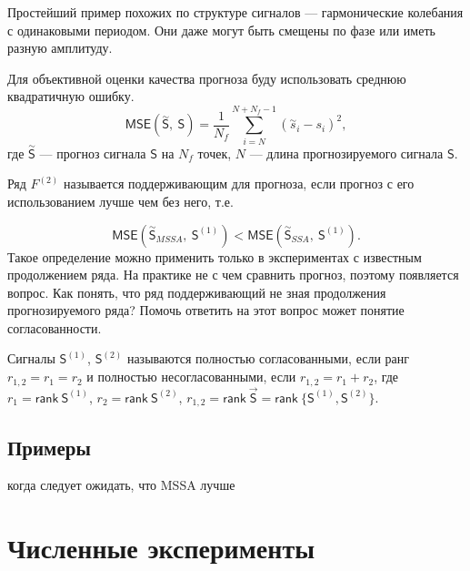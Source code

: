 \documentclass[specialist, substylefile = spbureport.rtx,
    subf,href,colorlinks=true, 12pt]{disser}
\newtheorem*{example}{Пример}
\newcommand{\rank}{\mathsf{rank}\ }
\newcommand{\sfS}{\mathsf{S}}
\newcommand{\MS}{\vec{\sfS}}
\newcommand{\MSE}{\mathsf{MSE}}
\begin{document}
        Простейший пример похожих по структуре сигналов --- гармонические колебания с одинаковыми периодом. Они даже могут быть смещены по фазе или иметь разную амплитуду.

        Для объективной оценки качества прогноза буду использовать среднюю квадратичную ошибку.
        $$\mathsf{MSE(\overset{\sim}{S},\ S)} = \frac{1}{N_{f}} \sum_{i = N}^{N + N_{f} - 1} (\overset{\sim}{s}_i - s_i)^2,$$
        где $\overset{\sim}{\sfS}$ --- прогноз сигнала $\sfS$ на $N_{f}$ точек, $N$ --- длина прогнозируемого сигнала $\sfS$.
    

        Ряд $F^{(2)}$ называется поддерживающим для прогноза, если прогноз с его использованием лучше чем без него, т.е.
    
        $$\MSE(\overset{\sim}{\sfS}_{MSSA},\ \sfS^{(1)}) < \MSE(\overset{\sim}{\sfS}_{SSA},\ \sfS^{(1)}).$$
        Такое определение можно применить только в экспериментах с известным продолжением ряда. На практике не с чем сравнить прогноз, поэтому появляется вопрос. Как понять, что ряд поддерживающий не зная продолжения прогнозируемого ряда? Помочь ответить на этот вопрос может понятие согласованности.

        Сигналы $\sfS^{(1)}$, $\sfS^{(2)}$ называются полностью согласованными, если ранг $r_{1,2} = r_1 = r_2$ и полностью несогласованными, если $r_{1,2} = r_1 + r_2$, где $r_1 = \rank \sfS^{(1)}$, $r_2 = \rank \sfS^{(2)}$, $r_{1,2} = \rank \MS = \rank \{\sfS^{(1)}, \sfS^{(2)}\}.$

    \section{Примеры}
        когда следует ожидать, что MSSA лучше


    \chapter{Численные эксперименты}
        
\end{document}
